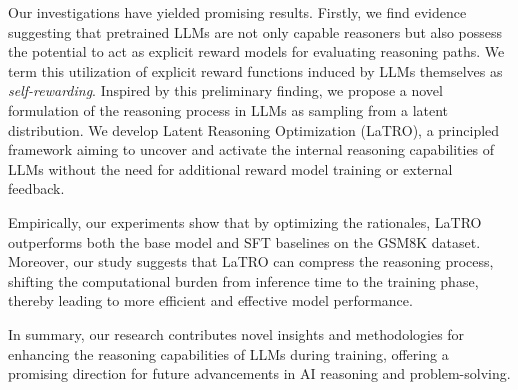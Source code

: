 Our investigations have yielded promising results. Firstly, we find evidence suggesting that pretrained LLMs are not only capable reasoners but also possess the potential to act as explicit reward models for evaluating reasoning paths. We term this utilization of explicit reward functions induced by LLMs themselves as \emph{self-rewarding}. Inspired by this preliminary finding, we propose a novel formulation of the reasoning process in LLMs as sampling from a latent distribution. We develop Latent Reasoning Optimization (LaTRO), a principled framework aiming to uncover and activate the internal reasoning capabilities of LLMs without the need for additional reward model training or external feedback.

Empirically, our experiments show that by optimizing the rationales, LaTRO outperforms both the base model and SFT baselines on the GSM8K dataset. Moreover, our study suggests that LaTRO can compress the reasoning process, shifting the computational burden from inference time to the training phase, thereby leading to more efficient and effective model performance.

In summary, our research contributes novel insights and methodologies for enhancing the reasoning capabilities of LLMs during training, offering a promising direction for future advancements in AI reasoning and problem-solving.